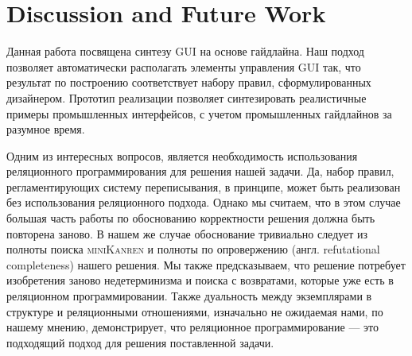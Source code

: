 
\section{Discussion and Future Work}

Данная работа посвящена синтезу  GUI на основе гайдлайна.
Наш подход позволяет автоматически располагать элементы управления GUI так, что результат по построению соответствует набору правил, сформулированных дизайнером.
Прототип реализации позволяет синтезировать реалистичные примеры промышленных интерфейсов, с учетом промышленных гайдлайнов за разумное время.


Одним из интересных вопросов, является необходимость использования реляционного программирования для решения нашей задачи.
Да, набор правил, регламентирующих систему переписывания, в принципе, может быть реализован без использования реляционного подхода.
Однако мы считаем, что в этом случае большая часть работы по обоснованию корректности решения должна быть повторена заново.
В нашем же случае обоснование тривиально следует из полноты поиска \textsc{miniKanren} и полноты по опровержению (англ. refutational completeness) нашего решения.
Мы также предсказываем, что решение потребует изобретения заново недетерминизма и поиска с возвратами, которые уже есть в реляционном программировании.
Также дуальность между экземплярами в структуре и реляционными отношениями, изначально не ожидаемая нами, по нашему мнению, демонстрирует, что реляционное программирование --- это подходящий подход для решения поставленной задачи.

%
%
%
